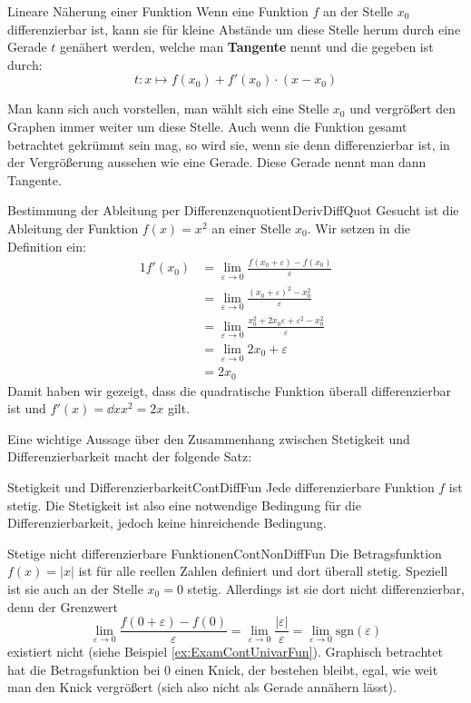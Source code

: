 \begin{definition}{Lineare Näherung einer Funktion}{}
    Wenn eine Funktion $f$ an der Stelle $x_0$ differenzierbar ist, kann sie für kleine Abstände um diese Stelle herum durch eine Gerade $t$ genähert werden, welche man \textbf{Tangente} nennt und die gegeben ist durch:
    $$
        t: x \mapsto f(x_0) + f'(x_0) \cdot (x-x_0)
    $$
\end{definition}

Man kann sich auch vorstellen, man wählt sich eine Stelle $x_0$ und vergrößert den Graphen immer weiter um diese Stelle. Auch wenn die Funktion gesamt betrachtet gekrümmt sein mag, so wird sie, wenn sie denn differenzierbar ist, in der Vergrößerung aussehen wie eine Gerade. Diese Gerade nennt man dann Tangente.

\begin{example}{Bestimmung der Ableitung per Differenzenquotient}{DerivDiffQuot}
    Gesucht ist die Ableitung der Funktion $f(x) = x^2$ an einer Stelle $x_0$. Wir setzen in die Definition ein:
    \begin{alignat}{1}
        f'(x_0) &= \lim\limits_{\varepsilon\to 0} \frac{f(x_0+\varepsilon) - f(x_0)}{\varepsilon} \\
                &= \lim\limits_{\varepsilon\to 0} \frac{(x_0+\varepsilon)^2-x_0^2}{\varepsilon} \\
                &= \lim\limits_{\varepsilon\to 0} \frac{x_0^2+2x_0\varepsilon+\varepsilon^2-x_0^2}{\varepsilon} \\
                &= \lim\limits_{\varepsilon\to 0} 2x_0+\varepsilon \\
                &= 2x_0
    \end{alignat}
    Damit haben wir gezeigt, dass die quadratische Funktion überall differenzierbar ist und $f'(x) = \dd{}{x} x^2 = 2x$ gilt.
\end{example}

Eine wichtige Aussage über den Zusammenhang zwischen Stetigkeit und Differenzierbarkeit macht der folgende Satz:

\begin{statement}{Stetigkeit und Differenzierbarkeit}{ContDiffFun}
    Jede differenzierbare Funktion $f$ ist stetig. Die Stetigkeit ist also eine notwendige Bedingung für die Differenzierbarkeit, jedoch keine hinreichende Bedingung.
\end{statement}

\begin{example}{Stetige nicht differenzierbare Funktionen}{ContNonDiffFun}
    Die Betragsfunktion $f(x) = |x|$ ist für alle reellen Zahlen definiert und dort überall stetig. Speziell ist sie auch an der Stelle $x_0=0$ stetig. Allerdings ist sie dort nicht differenzierbar, denn
    der Grenzwert
    $$
        \lim\limits_{\varepsilon\to 0} \frac{f(0+\varepsilon) - f(0)}{\varepsilon} = \lim\limits_{\varepsilon\to 0} \frac{|\varepsilon|}{\varepsilon} = \lim\limits_{\varepsilon\to 0} \text{sgn}(\varepsilon)
    $$
    existiert nicht (siehe Beispiel \ref{ex:ExamContUnivarFun}). Graphisch betrachtet hat die Betragsfunktion bei $0$ einen Knick, der bestehen bleibt, egal, wie weit man den Knick vergrößert (sich also nicht als Gerade annähern lässt).
\end{example}

